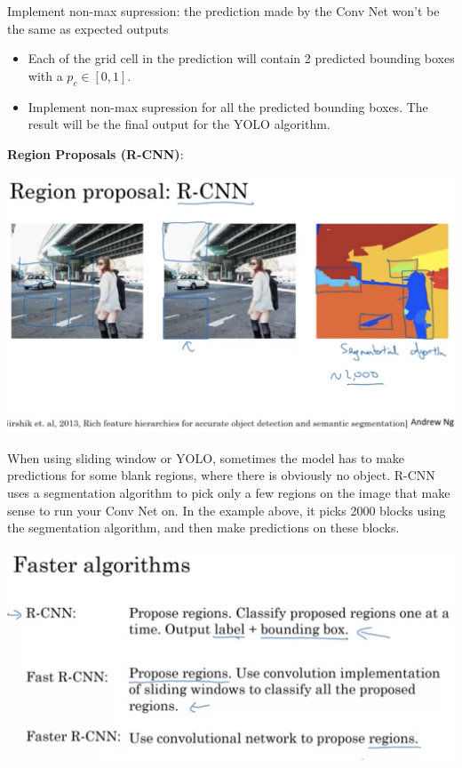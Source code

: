 \documentclass{article}
\begin{document}
\noindent Implement non-max supression: the prediction made by the Conv Net won't be the same as expected outputs

\begin{itemize}
    \item Each of the grid cell in the prediction will contain 2 predicted bounding boxes with a \(p_{c} \in [0, 1]\).
    \item Implement non-max supression for all the predicted bounding boxes. The result will be the final output for the YOLO algorithm.
\end{itemize}

\noindent \textbf{Region Proposals (R-CNN)}:

\begin{center}
\includegraphics[scale=0.3]{./images/rcnn.png}
\end{center}

\noindent When using sliding window or YOLO, sometimes the model has to make predictions for some blank regions, where there is obviously no object. R-CNN uses a segmentation algorithm to pick only a few regions on the image that make sense to run your Conv Net on. In the example above, it picks 2000 blocks using the segmentation algorithm, and then make predictions on these blocks.

\begin{center}
\includegraphics[scale=0.3]{./images/fast_rcnn.png}
\end{center}
\end{document}
